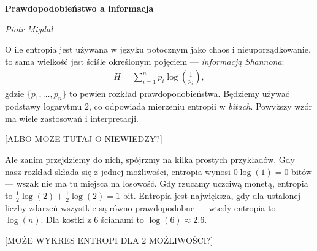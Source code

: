 \documentclass[10pt,a4paper]{article}
\begin{document}
\noindent\textbf{\LARGE Prawdopodobieństwo a informacja}

\medskip
\noindent\textit{\Large Piotr Migdał}

\medskip

O ile entropia jest używana w języku potocznym jako chaos i nieuporządkowanie, to sama wielkość jest ściśle określonym pojęciem --- \emph{informacją Shannona}:
%
%
\begin{align}
    H = \sum_{i=1}^{n} p_i \log \left(\tfrac{1}{p_i} \right),\label{eq:entropia}
\end{align}
%
%
gdzie $\{p_1, \ldots, p_n\}$ to pewien rozkład prawdopodobieństwa.
Będziemy używać podstawy logarytmu $2$, co odpowiada mierzeniu entropii w \emph{bitach}.
Powyższy wzór ma wiele zastosowań i interpretacji.

[ALBO MOŻE TUTAJ O NIEWIEDZY?]

Ale zanim przejdziemy do nich, spójrzmy na kilka prostych przykładów.
Gdy nasz rozkład składa się z jednej możliwości, entropia wynosi $0 \log(1) = 0$ bitów --- wszak nie ma tu miejsca na losowość.
Gdy rzucamy uczciwą monetą, entropia to $\tfrac{1}{2} \log(2) + \tfrac{1}{2} \log(2) = 1$ bit.
Entropia jest największa, gdy dla ustalonej liczby zdarzeń wszystkie są równo prawdopodobne --- wtedy entropia to $\log(n)$.
Dla kostki z $6$ ścianami to $\log(6)\approx 2.6$.

[MOŻE WYKRES ENTROPI DLA 2 MOŻLIWOŚCI?]

\end{document}
